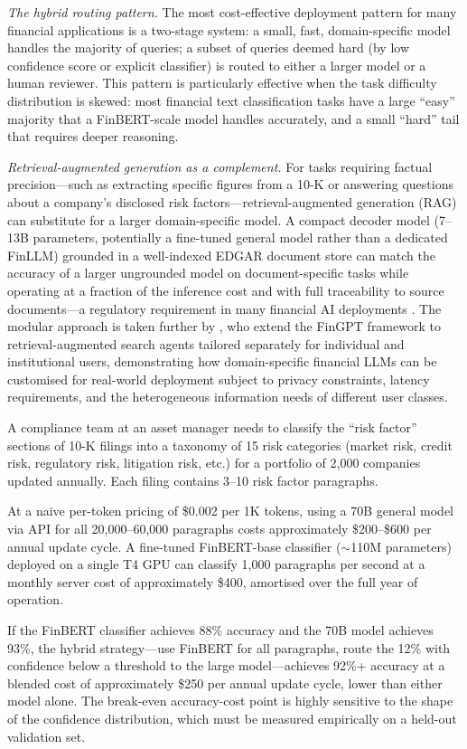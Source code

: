 \textit{The hybrid routing pattern.}  The most cost-effective deployment pattern
for many financial applications is a two-stage system: a small, fast, domain-specific
model handles the majority of queries; a subset of queries deemed hard (by low
confidence score or explicit classifier) is routed to either a larger model or
a human reviewer.  This pattern is particularly effective when the task difficulty
distribution is skewed: most financial text classification tasks have a large
``easy'' majority that a FinBERT-scale model handles accurately, and a small
``hard'' tail that requires deeper reasoning.

\textit{Retrieval-augmented generation as a complement.}  For tasks requiring
factual precision---such as extracting specific figures from a 10-K or answering
questions about a company's disclosed risk factors---retrieval-augmented generation
(RAG) \cite{lewis2020rag} can substitute for a larger domain-specific model.
A compact decoder model (7--13B parameters, potentially a fine-tuned general model
rather than a dedicated FinLLM) grounded in a well-indexed EDGAR document store
can match the accuracy of a larger ungrounded model on document-specific tasks
while operating at a fraction of the inference cost and with full traceability
to source documents---a regulatory requirement in many financial AI deployments
\cite{sr117}.  The modular approach is taken further by
\citet{Liu2024}, who extend the FinGPT framework to retrieval-augmented search
agents tailored separately for individual and institutional users, demonstrating
how domain-specific financial LLMs can be customised for real-world deployment
subject to privacy constraints, latency requirements, and the heterogeneous
information needs of different user classes.

\begin{example}
\label{ex:ch08-deployment}
A compliance team at an asset manager needs to classify the ``risk factor'' sections
of 10-K filings into a taxonomy of 15 risk categories (market risk, credit risk,
regulatory risk, litigation risk, etc.) for a portfolio of 2,000 companies updated
annually.  Each filing contains 3--10 risk factor paragraphs.

At a naive per-token pricing of \$0.002 per 1K tokens, using a 70B general model
via API for all 20,000--60,000 paragraphs costs approximately \$200--\$600 per
annual update cycle.  A fine-tuned FinBERT-base classifier ($\sim$110M parameters)
deployed on a single T4 GPU can classify 1,000 paragraphs per second at a monthly
server cost of approximately \$400, amortised over the full year of operation.

If the FinBERT classifier achieves 88\% accuracy and the 70B model achieves 93\%,
the hybrid strategy---use FinBERT for all paragraphs, route the 12\% with
confidence below a threshold to the large model---achieves 92\%+ accuracy at
a blended cost of approximately \$250 per annual update cycle, lower than either
model alone.  The break-even accuracy-cost point is highly sensitive to the shape
of the confidence distribution, which must be measured empirically on a held-out
validation set.
\end{example}

